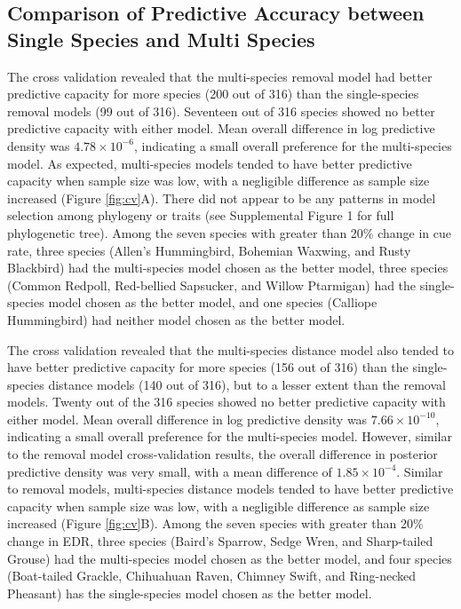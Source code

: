 \documentclass[12pt]{article}
\begin{document}
\subsection{Comparison of Predictive Accuracy between Single Species and Multi Species}

\par The cross validation revealed that the multi-species removal model had better predictive capacity for more species (200 out of 316) than the single-species removal models (99 out of 316).
Seventeen out of 316 species showed no better predictive capacity with either model.
Mean overall difference in log predictive density was $4.78 \times 10^{-6}$, indicating a small overall preference for the multi-species model.
As expected, multi-species models tended to have better predictive capacity when sample size was low, with a negligible difference as sample size increased (Figure \ref{fig:cv}A).
There did not appear to be any patterns in model selection among phylogeny or traits (see Supplemental Figure 1 for full phylogenetic tree).
Among the seven species with greater than 20\% change in cue rate, three species (Allen's Hummingbird, Bohemian Waxwing, and Rusty Blackbird) had the multi-species model chosen as the better model, three species (Common Redpoll, Red-bellied Sapsucker, and Willow Ptarmigan) had the single-species model chosen as the better model, and one species (Calliope Hummingbird) had neither model chosen as the better model.

\par The cross validation revealed that the multi-species distance model also tended to have better predictive capacity for more species (156 out of 316) than the single-species distance models (140 out of 316), but to a lesser extent than the removal models.
Twenty out of the 316 species showed no better predictive capacity with either model.
Mean overall difference in log predictive density was $7.66 \times 10^{-10}$, indicating a small overall preference for the multi-species model.
However, similar to the removal model cross-validation results, the overall difference in posterior predictive density was very small, with a mean difference of $1.85 \times 10^{-4}$.
Similar to removal models, multi-species distance models tended to have better predictive capacity when sample size was low, with a negligible difference as sample size increased (Figure \ref{fig:cv}B).
Among the seven species with greater than 20\% change in EDR, three species (Baird's Sparrow, Sedge Wren, and Sharp-tailed Grouse) had the multi-species model chosen as the better model, and four species (Boat-tailed Grackle, Chihuahuan Raven, Chimney Swift, and Ring-necked Pheasant) has the single-species model chosen as the better model.
\end{document}
